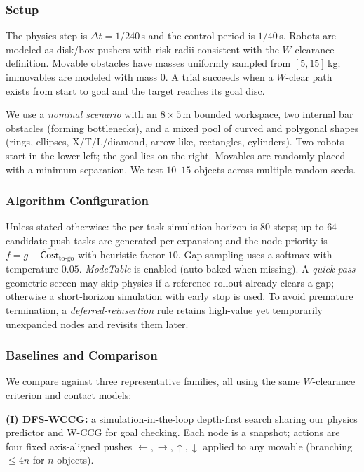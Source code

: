 \subsubsection{Setup}
\label{subsec:sim-setup}
The physics step is $\Delta t=1/240$\,s and the control period is $1/40$\,s. Robots are modeled as disk/box pushers with risk radii consistent with the $W$-clearance definition. Movable obstacles have masses uniformly sampled from $[5,15]$\,kg; immovables are modeled with mass $0$. A trial succeeds when a $W$-clear path exists from start to goal and the target reaches its goal disc.

We use a \emph{nominal scenario} with an $8{\times}5$\,m bounded workspace, two internal bar obstacles (forming bottlenecks), and a mixed pool of curved and polygonal shapes (rings, ellipses, X/T/L/diamond, arrow-like, rectangles, cylinders). Two robots start in the lower-left; the goal lies on the right. Movables are randomly placed with a minimum separation. We test $10\text{--}15$ objects across multiple random seeds.

\subsubsection{Algorithm Configuration}
\label{subsec:algo-config}
Unless stated otherwise: the per-task simulation horizon is $80$ steps; up to $64$ candidate push tasks are generated per expansion; and the node priority is $f=g+\widehat{\mathsf{Cost}}_{\text{to-go}}$ with heuristic factor $10$. Gap sampling uses a softmax with temperature $0.05$. \textit{ModeTable} is enabled (auto-baked when missing). A \emph{quick-pass} geometric screen may skip physics if a reference rollout already clears a gap; otherwise a short-horizon simulation with early stop is used. To avoid premature termination, a \emph{deferred-reinsertion} rule retains high-value yet temporarily unexpanded nodes and revisits them later.


\subsubsection{Baselines and Comparison}
\label{subsec:baselines}
We compare against three representative families, all using the same $W$-clearance criterion and contact models:

\textbf{(I) DFS-WCCG:} a simulation-in-the-loop depth-first search sharing our physics predictor and W-CCG for goal checking. Each node is a snapshot; actions are four fixed axis-aligned pushes ${\leftarrow,\rightarrow,\uparrow,\downarrow}$ applied to any movable (branching $\le 4n$ for $n$ objects).

